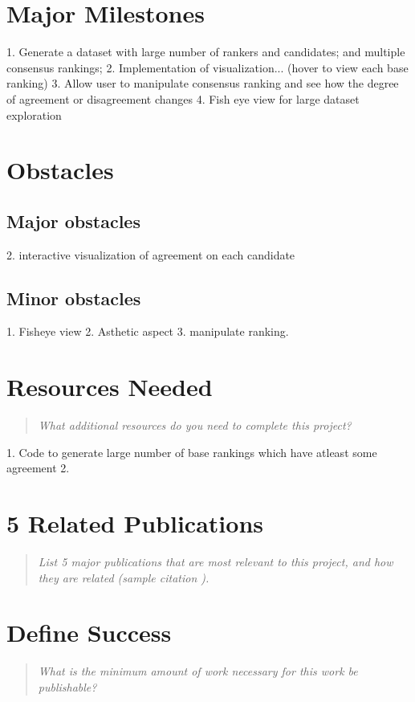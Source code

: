 \documentclass{proc}
\begin{document}
\section{Major Milestones}

1. Generate a dataset with large number of rankers and candidates; and multiple consensus rankings;
2. Implementation of visualization... (hover to view each base ranking)
3. Allow user to manipulate consensus ranking and see how the degree of agreement or disagreement changes
4. Fish eye view for large dataset exploration

\section{Obstacles}

\subsection{Major obstacles} %
2. interactive visualization of agreement on each candidate

\subsection{Minor obstacles}
1. Fisheye view
2. Asthetic aspect
3. manipulate ranking.

\section{Resources Needed}
\begin{quote}
\textit{What additional resources do you need to complete this project?}
\end{quote}

1. Code to generate large number of base rankings which have atleast some agreement 
2. 

\section{5 Related Publications}
\begin{quote}
\textit{List 5 major publications that are most relevant to this project, and how they are related (sample citation \cite{wijk2005value}).}
\end{quote}

\section{Define Success}
\begin{quote}
\textit{What is the minimum amount of work necessary for this work be publishable?}
\end{quote}



\end{document}
